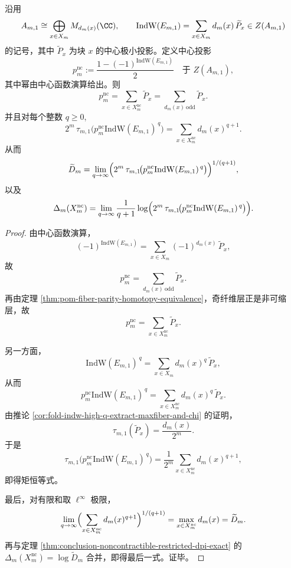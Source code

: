 \begin{theorem}[非可缩筛子的单中心元实现]\label{thm:conclusion-noncontractible-central-projector-indw}
沿用
\[
A_{m,1}\cong \bigoplus_{x\in X_m}M_{d_m(x)}(\CC),
\qquad
\mathrm{IndW}(E_{m,1})=\sum_{x\in X_m}d_m(x)\,\widetilde P_x\in Z(A_{m,1})
\]
的记号，其中 \(\widetilde P_x\) 为块 \(x\) 的中心极小投影。定义中心投影
\[
p_m^{\mathrm{nc}}
:=
\frac{1-(-1)^{\mathrm{IndW}(E_{m,1})}}{2}
\quad\text{于 }Z(A_{m,1}),
\]
其中幂由中心函数演算给出。则
\[
p_m^{\mathrm{nc}}
=
\sum_{x\in X_m^{\mathrm{nc}}}\widetilde P_x
=
\sum_{d_m(x)\ \mathrm{odd}}\widetilde P_x.
\]
并且对每个整数 \(q\ge 0\),
\[
2^m\,\tau_{m,1}\!\bigl(p_m^{\mathrm{nc}}\mathrm{IndW}(E_{m,1})^{\,q}\bigr)
=
\sum_{x\in X_m^{\mathrm{nc}}}d_m(x)^{q+1}.
\]
从而
\[
\widetilde D_m
=
\lim_{q\to\infty}
\Bigl(
2^m\,\tau_{m,1}\!\bigl(p_m^{\mathrm{nc}}\mathrm{IndW}(E_{m,1})^{\,q}\bigr)
\Bigr)^{1/(q+1)},
\]
以及
\[
\Delta_m(X_m^{\mathrm{nc}})
=
\lim_{q\to\infty}
\frac{1}{q+1}
\log
\Bigl(
2^m\,\tau_{m,1}\!\bigl(p_m^{\mathrm{nc}}\mathrm{IndW}(E_{m,1})^{\,q}\bigr)
\Bigr).
\]
\end{theorem}
\begin{proof}
由中心函数演算，
\[
(-1)^{\mathrm{IndW}(E_{m,1})}
=
\sum_{x\in X_m}(-1)^{d_m(x)}\,\widetilde P_x,
\]
故
\[
p_m^{\mathrm{nc}}
=
\sum_{d_m(x)\ \mathrm{odd}}\widetilde P_x.
\]
再由定理 \ref{thm:pom-fiber-parity-homotopy-equivalence}，奇纤维层正是非可缩层，故
\[
p_m^{\mathrm{nc}}
=
\sum_{x\in X_m^{\mathrm{nc}}}\widetilde P_x.
\]

另一方面，
\[
\mathrm{IndW}(E_{m,1})^{\,q}=\sum_{x\in X_m}d_m(x)^q\,\widetilde P_x,
\]
从而
\[
p_m^{\mathrm{nc}}\mathrm{IndW}(E_{m,1})^{\,q}
=
\sum_{x\in X_m^{\mathrm{nc}}}d_m(x)^q\,\widetilde P_x.
\]
由推论 \ref{cor:fold-indw-high-q-extract-maxfiber-and-chi} 的证明，
\[
\tau_{m,1}(\widetilde P_x)=\frac{d_m(x)}{2^m}.
\]
于是
\[
\tau_{m,1}\!\bigl(p_m^{\mathrm{nc}}\mathrm{IndW}(E_{m,1})^{\,q}\bigr)
=
\frac1{2^m}\sum_{x\in X_m^{\mathrm{nc}}}d_m(x)^{q+1},
\]
即得矩恒等式。

最后，对有限和取 \(\ell^\infty\) 极限，
\[
\lim_{q\to\infty}
\Bigl(\sum_{x\in X_m^{\mathrm{nc}}}d_m(x)^{q+1}\Bigr)^{1/(q+1)}
=
\max_{x\in X_m^{\mathrm{nc}}}d_m(x)
=
\widetilde D_m.
\]
再与定理 \ref{thm:conclusion-noncontractible-restricted-dpi-exact} 的
\(
\Delta_m(X_m^{\mathrm{nc}})=\log \widetilde D_m
\)
合并，即得最后一式。证毕。
\end{proof}

